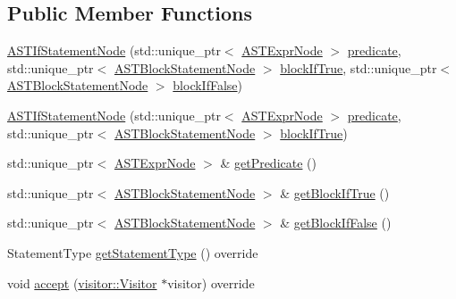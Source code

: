 \subsection*{Public Member Functions}
\begin{DoxyCompactItemize}
\item 
\hyperlink{classparser_1_1ast_1_1ASTIfStatementNode_a7a1228f06863f6c661941a718edf0f76}{A\+S\+T\+If\+Statement\+Node} (std\+::unique\+\_\+ptr$<$ \hyperlink{classparser_1_1ast_1_1ASTExprNode}{A\+S\+T\+Expr\+Node} $>$ \hyperlink{classparser_1_1ast_1_1ASTIfStatementNode_aa03b517ecf838b4ca92290f85873dacc}{predicate}, std\+::unique\+\_\+ptr$<$ \hyperlink{classparser_1_1ast_1_1ASTBlockStatementNode}{A\+S\+T\+Block\+Statement\+Node} $>$ \hyperlink{classparser_1_1ast_1_1ASTIfStatementNode_a41ce2a7eef7e04f060d06fd39b1634e9}{block\+If\+True}, std\+::unique\+\_\+ptr$<$ \hyperlink{classparser_1_1ast_1_1ASTBlockStatementNode}{A\+S\+T\+Block\+Statement\+Node} $>$ \hyperlink{classparser_1_1ast_1_1ASTIfStatementNode_a763d7c0df1b663ba69a38f5b744586f0}{block\+If\+False})
\item 
\hyperlink{classparser_1_1ast_1_1ASTIfStatementNode_a58f5fc968c7f49efa5acb3611af92696}{A\+S\+T\+If\+Statement\+Node} (std\+::unique\+\_\+ptr$<$ \hyperlink{classparser_1_1ast_1_1ASTExprNode}{A\+S\+T\+Expr\+Node} $>$ \hyperlink{classparser_1_1ast_1_1ASTIfStatementNode_aa03b517ecf838b4ca92290f85873dacc}{predicate}, std\+::unique\+\_\+ptr$<$ \hyperlink{classparser_1_1ast_1_1ASTBlockStatementNode}{A\+S\+T\+Block\+Statement\+Node} $>$ \hyperlink{classparser_1_1ast_1_1ASTIfStatementNode_a41ce2a7eef7e04f060d06fd39b1634e9}{block\+If\+True})
\item 
std\+::unique\+\_\+ptr$<$ \hyperlink{classparser_1_1ast_1_1ASTExprNode}{A\+S\+T\+Expr\+Node} $>$ \& \hyperlink{classparser_1_1ast_1_1ASTIfStatementNode_a709b472f90a91edf309c77cfc5fc0b25}{get\+Predicate} ()
\item 
std\+::unique\+\_\+ptr$<$ \hyperlink{classparser_1_1ast_1_1ASTBlockStatementNode}{A\+S\+T\+Block\+Statement\+Node} $>$ \& \hyperlink{classparser_1_1ast_1_1ASTIfStatementNode_a2db9e09e077f5fbb99c101ee0bf02887}{get\+Block\+If\+True} ()
\item 
std\+::unique\+\_\+ptr$<$ \hyperlink{classparser_1_1ast_1_1ASTBlockStatementNode}{A\+S\+T\+Block\+Statement\+Node} $>$ \& \hyperlink{classparser_1_1ast_1_1ASTIfStatementNode_a1f66f144fdb82bff3ead69fd563bcf73}{get\+Block\+If\+False} ()
\item 
Statement\+Type \hyperlink{classparser_1_1ast_1_1ASTIfStatementNode_aebe9139e5ee81c851aa01fd292635562}{get\+Statement\+Type} () override
\item 
void \hyperlink{classparser_1_1ast_1_1ASTIfStatementNode_a946a8196020e5d6c1a51a74d84d98e80}{accept} (\hyperlink{classvisitor_1_1Visitor}{visitor\+::\+Visitor} $\ast$visitor) override
\end{DoxyCompactItemize}
